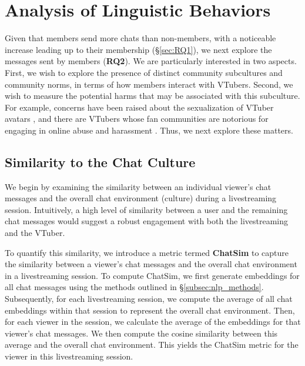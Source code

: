 \vspace{-2ex}
\section{Analysis of Linguistic Behaviors}
\label{sec:RQ2}

Given that members send more chats than non-members, with a noticeable increase leading up to their membership (\S\ref{sec:RQ1}), we next explore the messages sent by members (\textbf{RQ2}).
We are particularly interested in two aspects. 
First, we wish to explore the presence of distinct community subcultures and community norms, in terms of how members interact with VTubers. 
Second, we wish to measure the potential harms that may be associated with this subculture. For example, concerns have been raised about the sexualization of VTuber avatars \cite{10.1145/3637357}, and there are VTubers whose fan communities are notorious for engaging in online abuse and harassment \cite{seren, nyaru, jiaran}. Thus, we next explore these matters.












\subsection{Similarity to the Chat Culture}
\label{subsec:rq2_similarity}

We begin by examining the similarity between an individual viewer's chat messages and the overall chat environment (\ie culture) during a livestreaming session. Intuitively, a high level of similarity between a user and the remaining chat messages would suggest a robust engagement with both the livestreaming and the VTuber.

To quantify this similarity, we introduce a metric termed \textbf{ChatSim} to capture the similarity between a viewer's chat messages and the overall chat environment in a livestreaming session.
To compute ChatSim, we first generate embeddings for all chat messages using the methods outlined in \S\ref{subsec:nlp_methods}. Subsequently, for each livestreaming session, we compute the average of all chat embeddings within that session to represent the overall chat environment. Then, for each viewer in the session, we calculate the average of the embeddings for that viewer's chat messages. We then compute the cosine similarity between this average and the overall chat environment. This yields the ChatSim metric for the viewer in this livestreaming session. 



